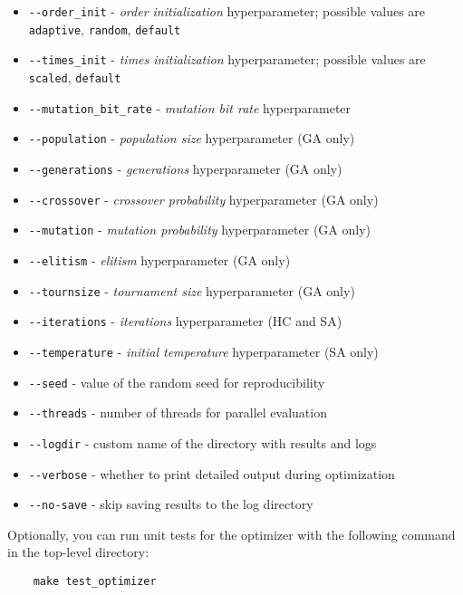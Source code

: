 \begin{itemize}
    \item \verb|--order_init| - \textit{order initialization} hyperparameter; possible values are \verb|adaptive|, \verb|random|, \verb|default|
    \item \verb|--times_init| - \textit{times initialization} hyperparameter; possible values are \verb|scaled|, \verb|default|
    \item \verb|--mutation_bit_rate| - \textit{mutation bit rate} hyperparameter
    \item \verb|--population| - \textit{population size} hyperparameter (GA only)
    \item \verb|--generations| - \textit{generations} hyperparameter (GA only)
    \item \verb|--crossover| - \textit{crossover probability} hyperparameter (GA only)
    \item \verb|--mutation| - \textit{mutation probability} hyperparameter (GA only)
    \item \verb|--elitism| - \textit{elitism} hyperparameter (GA only)
    \item \verb|--tournsize| - \textit{tournament size} hyperparameter (GA only)
    \item \verb|--iterations| - \textit{iterations} hyperparameter (HC and SA)
    \item \verb|--temperature| - \textit{initial temperature} hyperparameter (SA only)
    \item \verb|--seed| - value of the random seed for reproducibility
    \item \verb|--threads| - number of threads for parallel evaluation
    \item \verb|--logdir| - custom name of the directory with results and logs
    \item \verb|--verbose| - whether to print detailed output during optimization
    \item \verb|--no-save| - skip saving results to the log directory
\end{itemize}

\bigskip

Optionally, you can run unit tests for the optimizer with the following command in the top-level directory:
\begin{verbatim}
    make test_optimizer
\end{verbatim}


